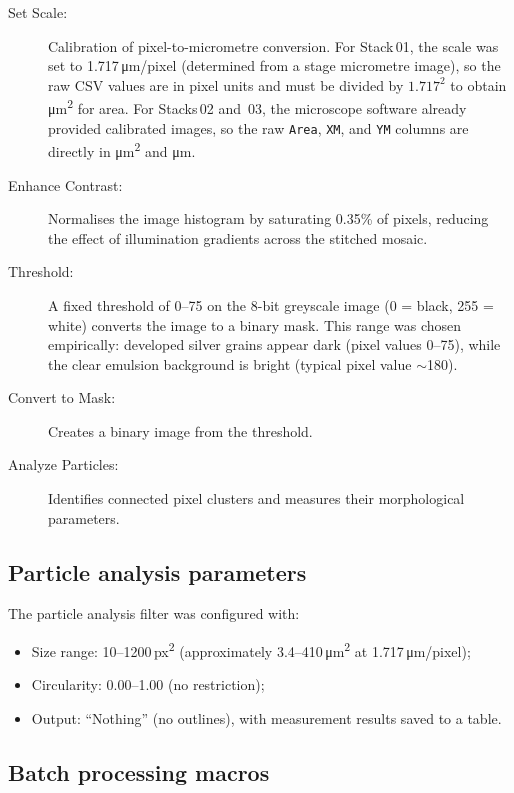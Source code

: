 \documentclass[12pt,a4paper]{article}
\begin{document}
\begin{description}
  \item[Set Scale:] Calibration of pixel-to-micrometre conversion.
        For Stack\,01, the scale was set to 1.717\,\si{\micro\meter}/pixel (determined from
        a stage micrometre image), so the raw CSV values are in pixel
        units and must be divided by $1.717^2$ to obtain
        \si{\micro\meter\squared} for area. For Stacks\,02 and~03, the
        microscope software already provided calibrated images, so the
        raw \texttt{Area}, \texttt{XM}, and \texttt{YM} columns are
        directly in \si{\micro\meter\squared} and \si{\micro\meter}.  
  \item[Enhance Contrast:] Normalises the image histogram by saturating
        0.35\% of pixels, reducing the effect of illumination gradients
        across the stitched mosaic.
  \item[Threshold:] A fixed threshold of 0--75 on the 8-bit greyscale
        image (0 = black, 255 = white) converts the image to a binary
        mask. This range was chosen empirically: developed silver
        grains appear dark (pixel values 0--75), while the clear
        emulsion background is bright (typical pixel value $\sim$180).
  \item[Convert to Mask:] Creates a binary image from the threshold.
  \item[Analyze Particles:] Identifies connected pixel clusters and
        measures their morphological parameters.
\end{description}

\subsection{Particle analysis parameters}

The particle analysis filter was configured with:
\begin{itemize}
  \item Size range: 10--1200\,px\textsuperscript{2}
        (approximately 3.4--410\,\si{\micro\meter\squared}
        at 1.717\,\si{\micro\meter}/pixel);
  \item Circularity: 0.00--1.00 (no restriction);
  \item Output: ``Nothing'' (no outlines), with measurement results
        saved to a table.
\end{itemize}

\subsection{Batch processing macros}
\end{document}
